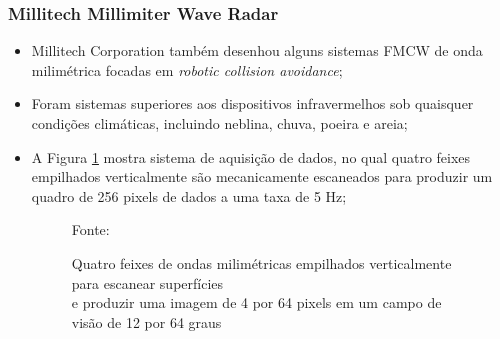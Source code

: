 \documentclass[xcolor=dvipsnames, aspectratio=169]{beamer}
\begin{document}
\begin{frame}
\frametitle{Millitech Millimiter Wave Radar}
	\begin{itemize}
		\item Millitech Corporation também desenhou alguns sistemas FMCW de onda milimétrica focadas em \textit{robotic collision avoidance};
		\item Foram sistemas superiores aos dispositivos infravermelhos sob quaisquer condições climáticas, incluindo neblina, chuva, poeira e areia;
        \item A Figura \ref{fig:militech} mostra sistema de aquisição de dados, no qual quatro feixes empilhados verticalmente são mecanicamente escaneados para produzir um quadro de 256 pixels de dados a uma taxa de 5 Hz;
        \begin{figure}
            \centering
            {Fonte: \cite{everett1995sensors}}
            \caption{Quatro feixes de ondas milimétricas empilhados verticalmente para escanear superfícies \\ e produzir uma imagem de 4 por 64 pixels em um campo de visão de 12 por 64 graus}
            \label{fig:militech}
        \end{figure}
        

\end{itemize}
\end{frame}
\end{document}

